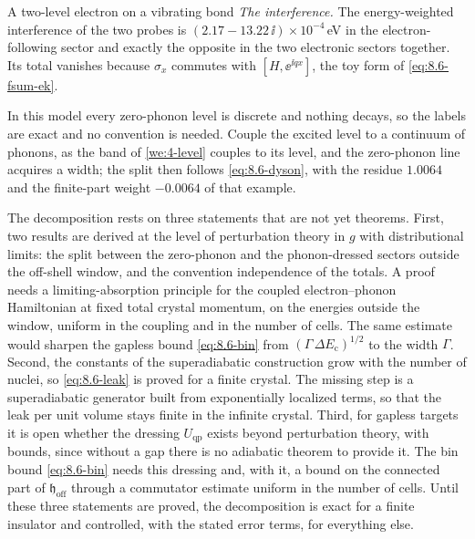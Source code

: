 \begin{workedexample}{A two-level electron on a vibrating bond}
\emph{The interference.} The energy-weighted interference of the two probes is $(2.17 - 13.22\,\ii)\times10^{-4}$\,eV in the electron-following sector and exactly the opposite in the two electronic sectors together. Its total vanishes because $\sigma_x$ commutes with $[H, \ee^{\ii qx}]$, the toy form of \cref{eq:8.6-fsum-ek}.

In this model every zero-phonon level is discrete and nothing decays, so the labels are exact and no convention is needed. Couple the excited level to a continuum of phonons, as the band of \cref{we:4-level} couples to its level, and the zero-phonon line acquires a width; the split then follows \cref{eq:8.6-dyson}, with the residue $1.0064$ and the finite-part weight $-0.0064$ of that example.
\end{workedexample}

The decomposition rests on three statements that are not yet theorems. First, two results are derived at the level of perturbation theory in $g$ with distributional limits: the split between the zero-phonon and the phonon-dressed sectors outside the off-shell window, and the convention independence of the totals. A proof needs a limiting-absorption principle for the coupled electron--phonon Hamiltonian at fixed total crystal momentum, on the energies outside the window, uniform in the coupling and in the number of cells. The same estimate would sharpen the gapless bound \cref{eq:8.6-bin} from $(\varGamma\,\Delta E_{\mathrm{c}})^{1/2}$ to the width $\varGamma$. Second, the constants of the superadiabatic construction grow with the number of nuclei, so \cref{eq:8.6-leak} is proved for a finite crystal. The missing step is a superadiabatic generator built from exponentially localized terms, so that the leak per unit volume stays finite in the infinite crystal. Third, for gapless targets it is open whether the dressing $U_{\mathrm{qp}}$ exists beyond perturbation theory, with bounds, since without a gap there is no adiabatic theorem to provide it. The bin bound \cref{eq:8.6-bin} needs this dressing and, with it, a bound on the connected part of $\mathfrak{h}_{\mathrm{off}}$ through a commutator estimate uniform in the number of cells. Until these three statements are proved, the decomposition is exact for a finite insulator and controlled, with the stated error terms, for everything else.
